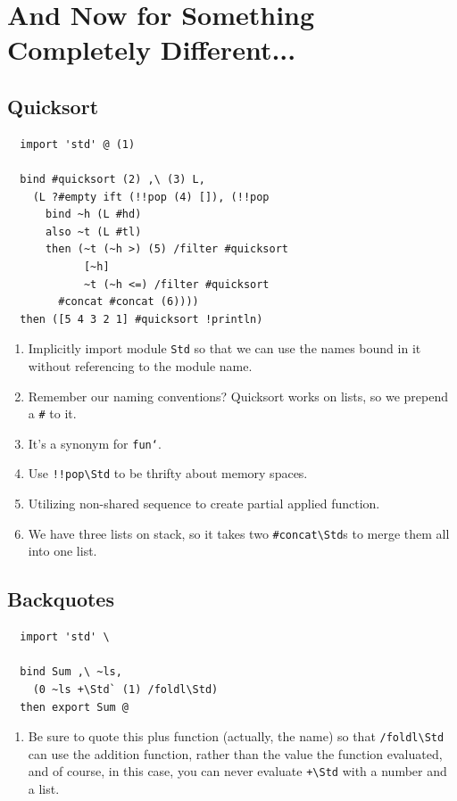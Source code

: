 \documentclass{report}
\newcommand{\mstd}[1]{\texttt{#1\textbackslash Std}}
\begin{document}
\section{And Now for Something Completely Different...}

\subsection{Quicksort}
\begin{mdframed}[style=example]
\begin{verbatim}
  import 'std' @ (1)

  bind #quicksort (2) ,\ (3) L,
    (L ?#empty ift (!!pop (4) []), (!!pop
      bind ~h (L #hd)
      also ~t (L #tl)
      then (~t (~h >) (5) /filter #quicksort
            [~h]
            ~t (~h <=) /filter #quicksort
        #concat #concat (6))))
  then ([5 4 3 2 1] #quicksort !println)
\end{verbatim}
\end{mdframed}

\begin{enumerate}
\item Implicitly import module \texttt{Std} so that we can use the names bound in it without referencing to the module name.
\item Remember our naming conventions? Quicksort works on lists, so we prepend a \texttt{\#} to it.
\item It's a synonym for \texttt{fun`}.
\item Use \mstd{!!pop} to be thrifty about memory spaces.
\item Utilizing non-shared sequence to create partial applied function.
\item We have three lists on stack, so it takes two \mstd{\#concat}s to merge them all into one list.
\end{enumerate}

\subsection{Backquotes}
\label{ssec:backquote}
\begin{mdframed}[style=example]
\begin{verbatim}
  import 'std' \

  bind Sum ,\ ~ls,
    (0 ~ls +\Std` (1) /foldl\Std)
  then export Sum @
\end{verbatim}
\end{mdframed}

\begin{enumerate}
\item Be sure to quote this plus function (actually, the name) so that \mstd{/foldl} can use the addition function, rather than the value the function evaluated, and of course, in this case, you can never evaluate \mstd{+} with a number and a list.
\end{enumerate}
\end{document}
